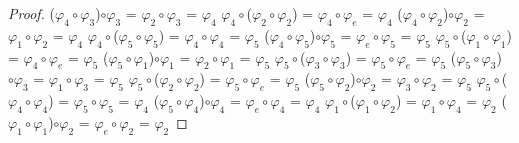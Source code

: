 \documentclass[10pt,a4paper,oneside]{article}
\begin{document}
\begin{proof}
				($\varphi_{4}\circ\varphi_{3}$)$\circ\varphi_{3}$ = $\varphi_{2}\circ\varphi_{3}$ = $\varphi_{4}$
				\newline
				\newline
				$\varphi_{4}\circ$($\varphi_{2}\circ\varphi_{2}$) = $\varphi_{4}\circ\varphi_{e}$ = $\varphi_{4}$
				\newline
				($\varphi_{4}\circ\varphi_{2}$)$\circ\varphi_{2}$ = $\varphi_{1}\circ\varphi_{2}$ = $\varphi_{4}$
				\newline
				\newline
				$\varphi_{4}\circ$($\varphi_{5}\circ\varphi_{5}$) = $\varphi_{4}\circ\varphi_{4}$ = $\varphi_{5}$
				\newline
				($\varphi_{4}\circ\varphi_{5}$)$\circ\varphi_{5}$ = $\varphi_{e}\circ\varphi_{5}$ = $\varphi_{5}$
				\newline
				\newline
				$\varphi_{5}\circ$($\varphi_{1}\circ\varphi_{1}$) = $\varphi_{4}\circ\varphi_{e}$ = $\varphi_{5}$
				\newline
				($\varphi_{5}\circ\varphi_{1}$)$\circ\varphi_{1}$ = $\varphi_{2}\circ\varphi_{1}$ = $\varphi_{5}$
				\newline
				\newline
				$\varphi_{5}\circ$($\varphi_{3}\circ\varphi_{3}$) = $\varphi_{5}\circ\varphi_{e}$ = $\varphi_{5}$
				\newline
				($\varphi_{5}\circ\varphi_{3}$)$\circ\varphi_{3}$ = $\varphi_{1}\circ\varphi_{3}$ = $\varphi_{5}$
				\newline
				\newline
				$\varphi_{5}\circ$($\varphi_{2}\circ\varphi_{2}$) = $\varphi_{5}\circ\varphi_{e}$ = $\varphi_{5}$
				\newline
				($\varphi_{5}\circ\varphi_{2}$)$\circ\varphi_{2}$ = $\varphi_{3}\circ\varphi_{2}$ = $\varphi_{5}$
				\newline
				\newline
				$\varphi_{5}\circ$($\varphi_{4}\circ\varphi_{4}$) = $\varphi_{5}\circ\varphi_{5}$ = $\varphi_{4}$
				\newline
				($\varphi_{5}\circ\varphi_{4}$)$\circ\varphi_{4}$ = $\varphi_{e}\circ\varphi_{4}$ = $\varphi_{4}$
				\newline
				\newline
				$\varphi_{1}\circ$($\varphi_{1}\circ\varphi_{2}$) = $\varphi_{1}\circ\varphi_{4}$ = $\varphi_{2}$
				\newline
				($\varphi_{1}\circ\varphi_{1}$)$\circ\varphi_{2}$ = $\varphi_{e}\circ\varphi_{2}$ = $\varphi_{2}$

\end{proof}
\end{document}
